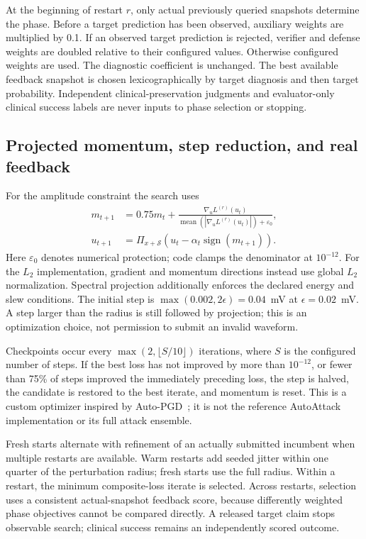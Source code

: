 At the beginning of restart $r$, only actual previously queried snapshots determine the phase. Before a target prediction has been observed, auxiliary weights are multiplied by 0.1. If an observed target prediction is rejected, verifier and defense weights are doubled relative to their configured values. Otherwise configured weights are used. The diagnostic coefficient is unchanged. The best available feedback snapshot is chosen lexicographically by target diagnosis and then target probability. Independent clinical-preservation judgments and evaluator-only clinical success labels are never inputs to phase selection or stopping.

\subsection{Projected momentum, step reduction, and real feedback}
For the amplitude constraint the search uses
\begin{align}
 m_{t+1}&=0.75m_t+
 \frac{\nabla_uL^{(r)}(u_t)}{\operatorname{mean}(|\nabla_uL^{(r)}(u_t)|)+\varepsilon_0},\\
 u_{t+1}&=\Pi_{x+\mathcal S}\!\left(u_t-\alpha_t\operatorname{sign}(m_{t+1})\right).
\end{align}
Here $\varepsilon_0$ denotes numerical protection; code clamps the denominator at $10^{-12}$. For the $L_2$ implementation, gradient and momentum directions instead use global $L_2$ normalization. Spectral projection additionally enforces the declared energy and slew conditions. The initial step is $\max(0.002,2\epsilon)=0.04$~mV at $\epsilon=0.02$~mV. A step larger than the radius is still followed by projection; this is an optimization choice, not permission to submit an invalid waveform.

Checkpoints occur every $\max(2,\lfloor S/10\rfloor)$ iterations, where $S$ is the configured number of steps. If the best loss has not improved by more than $10^{-12}$, or fewer than 75\% of steps improved the immediately preceding loss, the step is halved, the candidate is restored to the best iterate, and momentum is reset. This is a custom optimizer inspired by Auto-PGD~\cite{autopgd}; it is not the reference AutoAttack implementation or its full attack ensemble.

Fresh starts alternate with refinement of an actually submitted incumbent when multiple restarts are available. Warm restarts add seeded jitter within one quarter of the perturbation radius; fresh starts use the full radius. Within a restart, the minimum composite-loss iterate is selected. Across restarts, selection uses a consistent actual-snapshot feedback score, because differently weighted phase objectives cannot be compared directly. A released target claim stops observable search; clinical success remains an independently scored outcome.

